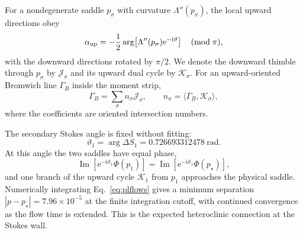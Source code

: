 \documentclass[11pt]{article}
\newcommand{\e}{\mathrm e}
\newcommand{\ii}{\mathrm i}
\begin{document}
For a nondegenerate saddle $p_\sigma$ with curvature $\Lambda''(p_\sigma)$, the local upward directions obey
\begin{equation}
 \alpha_{\rm up}=-\frac12\arg\!\left[\Lambda''(p_\sigma)\e^{-\ii\vartheta}\right]\quad (\mathrm{mod}\;\pi),
 \label{eq:updirection}
\end{equation}
with the downward directions rotated by $\pi/2$. We denote the downward thimble through $p_\sigma$ by $\mathcal J_\sigma$ and its upward dual cycle by $\mathcal K_\sigma$. For an upward-oriented Bromwich line $\Gamma_B$ inside the moment strip,
\begin{equation}
 \Gamma_B=\sum_\sigma n_\sigma\mathcal J_\sigma,
 \qquad
 n_\sigma=\langle\Gamma_B,\mathcal K_\sigma\rangle,
 \label{eq:thimbledecomp}
\end{equation}
where the coefficients are oriented intersection numbers.

The secondary Stokes angle is fixed without fitting:
\begin{equation}
 \boxed{\vartheta_1=\arg\Delta S_1=0.726693312478\ \mathrm{rad}.}
 \label{eq:stokesangle}
\end{equation}
At this angle the two saddles have equal phase,
\begin{equation}
 \operatorname{Im}\!\left[\e^{-\ii\vartheta_1}\Phi(p_1)\right]
 =\operatorname{Im}\!\left[\e^{-\ii\vartheta_1}\Phi(p_\star)\right],
\end{equation}
and one branch of the upward cycle $\mathcal K_1$ from $p_1$ approaches the physical saddle. Numerically integrating Eq.~\eqref{eq:plflows} gives a minimum separation $|p-p_\star|=7.96\times10^{-5}$ at the finite integration cutoff, with continued convergence as the flow time is extended. This is the expected heteroclinic connection at the Stokes wall.
\end{document}
